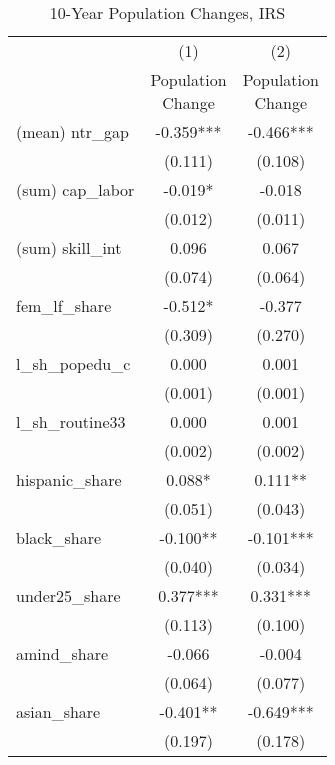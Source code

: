 \begin{table}[htbp]\centering
\def\sym#1{\ifmmode^{#1}\else\(^{#1}\)\fi}
\caption{10-Year Population Changes, IRS}
\begin{tabular}{l*{2}{c}}
\toprule
                    &\multicolumn{1}{c}{(1)}   &\multicolumn{1}{c}{(2)}   \\
                    &\shortstack{Population\\Change}   &\shortstack{Population\\Change}   \\
\midrule
(mean) ntr\_gap      &   -0.359***&   -0.466***\\
                    &  (0.111)   &  (0.108)   \\
\addlinespace
(sum) cap\_labor     &   -0.019*  &   -0.018   \\
                    &  (0.012)   &  (0.011)   \\
\addlinespace
(sum) skill\_int     &    0.096   &    0.067   \\
                    &  (0.074)   &  (0.064)   \\
\addlinespace
fem\_lf\_share        &   -0.512*  &   -0.377   \\
                    &  (0.309)   &  (0.270)   \\
\addlinespace
l\_sh\_popedu\_c       &    0.000   &    0.001   \\
                    &  (0.001)   &  (0.001)   \\
\addlinespace
l\_sh\_routine33      &    0.000   &    0.001   \\
                    &  (0.002)   &  (0.002)   \\
\addlinespace
hispanic\_share      &    0.088*  &    0.111** \\
                    &  (0.051)   &  (0.043)   \\
\addlinespace
black\_share         &   -0.100** &   -0.101***\\
                    &  (0.040)   &  (0.034)   \\
\addlinespace
under25\_share       &    0.377***&    0.331***\\
                    &  (0.113)   &  (0.100)   \\
\addlinespace
amind\_share         &   -0.066   &   -0.004   \\
                    &  (0.064)   &  (0.077)   \\
\addlinespace
asian\_share         &   -0.401** &   -0.649***\\
                    &  (0.197)   &  (0.178)   \\

\end{tabular}
\end{table}

